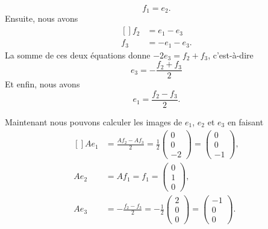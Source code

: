 \begin{equation}
	f_1=e_2.
\end{equation}
Ensuite, nous avons
\begin{equation}
	\begin{aligned}[]
		f_2 & =e_1-e_3   \\
		f_3 & =-e_1-e_3.
	\end{aligned}
\end{equation}
La somme de ces deux équations donne \( -2e_3=f_2+f_3\), c'est-à-dire
\begin{equation}
	e_3=-\frac{ f_2+f_3 }{ 2 }
\end{equation}
Et enfin, nous avons
\begin{equation}
	e_1=\frac{ f_2-f_3 }{ 2 }.
\end{equation}

Maintenant nous pouvons calculer les images de \( e_1\), \( e_2\) et \( e_3\) en faisant
\begin{equation}
	\begin{aligned}[]
		Ae_1 & =\frac{ Af_2-Af_3 }{ 2 }=\frac{1 }{2}\begin{pmatrix}
			                                            0 \\
			                                            0 \\
			                                            -2
		                                            \end{pmatrix}=\begin{pmatrix}
			                                                          0 \\
			                                                          0 \\
			                                                          -1
		                                                          \end{pmatrix},  \\
		Ae_2 & =Af_1=f_1=\begin{pmatrix}
			                 0 \\
			                 1 \\
			                 0
		                 \end{pmatrix},                                           \\
		Ae_3 & =-\frac{ f_2-f_3 }{ 2 }=-\frac{ 1 }{2}\begin{pmatrix}
			                                             2 \\
			                                             0 \\
			                                             0
		                                             \end{pmatrix}=\begin{pmatrix}
			                                                           -1 \\
			                                                           0  \\
			                                                           0
		                                                           \end{pmatrix}.
	\end{aligned}
\end{equation}
